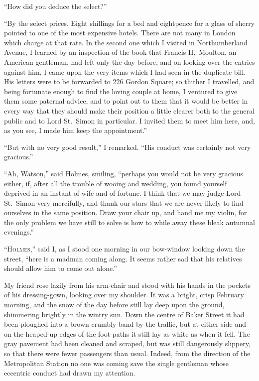 “How did you deduce the select?”

“By the select prices. Eight shillings for a bed and
eightpence for a glass of sherry pointed to one of the most
expensive hotels. There are not many in London which charge at
that rate. In the second one which I visited in Northumberland
Avenue, I learned by an inspection of the book that Francis
H.\ Moulton, an American gentleman, had left only the day
before, and on looking over the entries against him, I came
upon the very items which I had seen in the duplicate bill.
His letters were to be forwarded to 226 Gordon Square; so
thither I travelled, and being fortunate enough to find the
loving couple at home, I ventured to give them some paternal
advice, and to point out to them that it would be better in
every way that they should make their position a little clearer
both to the general public and to Lord St.~Simon in particular.
I invited them to meet him here, and, as you see, I
made him keep the appointment.”

“But with no very good result,” I remarked. “His conduct
was certainly not very gracious.”

“Ah, Watson,” said Holmes, smiling, “perhaps you would
not be very gracious either, if, after all the trouble of wooing
and wedding, you found yourself deprived in an instant of
wife and of fortune. I think that we may judge Lord St.~Simon
very mercifully, and thank our stars that we are never likely
to find ourselves in the same position. Draw your chair up,
and hand me my violin, for the only problem we have still to
solve is how to while away these bleak autumnal evenings.”


“\textsc{Holmes},” said I, as I stood one morning in our
bow-window looking down the street, “here is a
madman coming along. It seems rather sad that
his relatives should allow him to come out alone.”

My friend rose lazily from his arm-chair and stood with
his hands in the pockets of his dressing-gown, looking over
my shoulder. It was a bright, crisp February morning, and
the snow of the day before still lay deep upon the ground,
shimmering brightly in the wintry sun. Down the centre of
Baker Street it had been ploughed into a brown crumbly band
by the traffic, but at either side and on the heaped-up edges of
the foot-paths it still lay as white as when it fell. The gray
pavement had been cleaned and scraped, but was still dangerously
slippery, so that there were fewer passengers than usual.
Indeed, from the direction of the Metropolitan Station no one
was coming save the single gentleman whose eccentric conduct
had drawn my attention.


